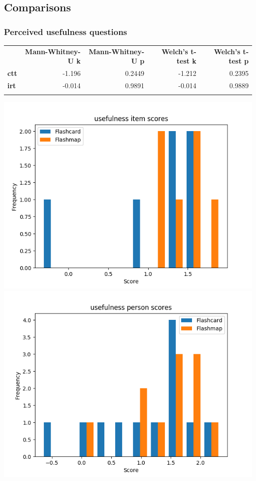 \documentclass[]{article}
\begin{document}
\subsection{Comparisons}\label{comparisons-2}

\subsubsection{Perceived usefulness
questions}\label{perceived-usefulness-questions}

\begin{longtable}[c]{@{}lrrrr@{}}
\toprule\addlinespace
& \textbf{Mann-Whitney-U k} & \textbf{Mann-Whitney-U p} &
\textbf{Welch's t-test k} & \textbf{Welch's t-test p}
\\\addlinespace
\midrule\endhead
\textbf{ctt} & -1.196 & 0.2449 & -1.212 & 0.2395
\\\addlinespace
\textbf{irt} & -0.014 & 0.9891 & -0.014 & 0.9889
\\\addlinespace
\bottomrule
\end{longtable}

\includegraphics{usefulness_diff.png}
\includegraphics{usefulness_abil.png}
\end{document}
